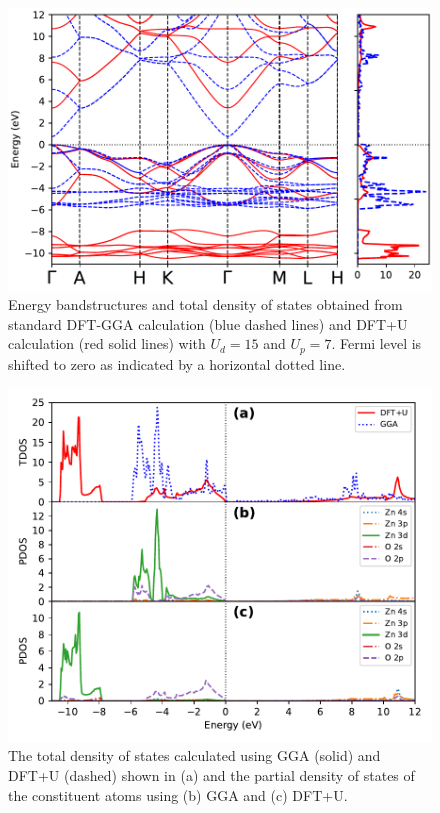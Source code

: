 \begin{figure}[tbh!]
	\centering
	\includegraphics[width=0.7\linewidth]{"images/rnd/band-dos_juxtapose"}
	\caption[Energy bandstructures and total density of states obtained from standard DFT-GGA calculation (blue dashed lines) and DFT+U calculation (red solid lines)with $U_d =15$ and $U_p= 7$]{Energy bandstructures and total density of states obtained from standard DFT-GGA calculation (blue dashed lines) and DFT+U calculation (red solid lines) with $U_d =15$ and $U_p= 7$. Fermi level is shifted to zero as indicated by a horizontal dotted line. }
	\label{fig:hubbard_band-dos}
\end{figure}


\begin{figure}[tbh!]
	\centering
	\includegraphics[width=0.7\linewidth]{"images/rnd/dos-pdos_juxtapose"}
	\caption[The total density of states calculated using GGA (solid) and DFT+U (dashed) shown in (a) and the partial density of states of the constituent atoms using (b) GGA and (c) DFT+U]{ The total density of states calculated using GGA (solid) and DFT+U (dashed) shown in (a) and the partial density of states of the constituent atoms using (b) GGA and (c) DFT+U.}
	\label{fig:hubbard_pdos}
\end{figure}

